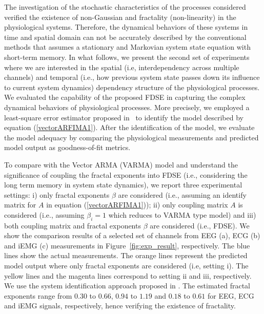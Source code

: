 The investigation of the stochastic characteristics of the processes considered verified the existence of non-Gaussian and fractality (non-linearity) in the physiological systems. Therefore, the dynamical behaviors of these systems in time and spatial domain can not be accurately described by the conventional methods that assumes a stationary and Markovian system state equation with short-term memory. In what follows, we present the second set of experiments where we are interested in the spatial (i.e, interdependency across multiple channels) and temporal (i.e., how previous system state passes down its influence to current system dynamics) dependency structure of the physiological processes. We evaluated the capability of the proposed FDSE in capturing the complex dynamical behaviors of physiological processes. More precisely, we employed a least-square error estimator proposed in~\cite{xue2016spatio,xue2016minimum} to identify the model described by equation (\ref{vectorARFIMA1}). After the identification of the model, we evaluate the model adequacy by comparing the physiological measurements and predicted model output as goodness-of-fit metrics. 

To compare with the Vector ARMA (VARMA) model and understand the significance of coupling the fractal exponents into FDSE (i.e., considering the long term memory in system state dynamics), we report three experimental settings: i) only fractal exponents $\beta$ are considered (i.e., assuming an identify matrix for $A$ in equation (\ref{vectorARFIMA1})); ii) only coupling matrix $A$ is considered (i.e., assuming $\beta_{i}=1$ which reduces to VARMA type model) and iii) both coupling matrix and fractal exponents $\beta$ are considered (i.e., FDSE). We show the comparison results of a selected set of channels from EEG (a), ECG (b) and iEMG (c) measurements in Figure~\ref{fig:exp_result}, respectively. The blue lines show the actual measurements. The orange lines represent the predicted model output where only fractal exponents are considered (i.e, setting i). The yellow lines and the magenta lines correspond to setting ii and iii, respectively. We use the system identification approach proposed in \cite{xue2016spatio}. The estimated fractal exponents range from $ 0.30$ to $0.66$, $0.94$ to $1.19$ and $0.18$ to $0.61$ for EEG, ECG and iEMG signals, respectively, hence verifying the existence of fractality.

